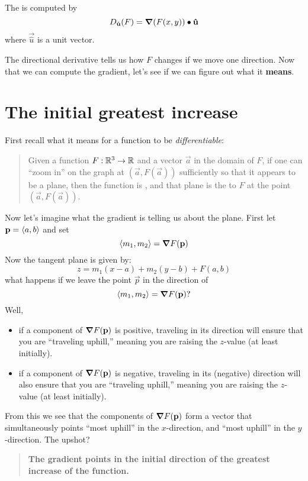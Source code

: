 \documentclass{ximera}
\begin{document}
\begin{definition}
  The  is computed by
  \[
  D_\mathbf{\hat{u}}(F) = \boldsymbol\nabla(F(x,y))\bullet \mathbf{\hat{u}}
  \]
  where $\vec{\hat{u}}$ is a unit vector.
\end{definition}

The directional derivative tells us how $F$ changes if we move one
direction.  Now that we can compute the gradient, let's see if we can
figure out what it \textbf{means}.

\section{The initial greatest increase}

First recall what it means for a function to be \textit{differentiable}:
\begin{quote}%
  Given a function $F:\mathbb R^3\to\mathbb R$ and a vector $\vec{a}$ in the domain
  of $F$, if one can ``zoom in'' on the graph at $(\vec{a}, F(\vec{a}))$
  sufficiently so that it appears to be a plane, then the
  function is , and that plane is the 
  to $F$ at the point $(\vec{a},F(\vec{a}))$.
\end{quote}

Now let's imagine what the gradient is telling us about the
plane. First let $\mathbf{p}=\left\langle a,b\right\rangle$ and set
\[
\left\langle m_1,m_2\right\rangle = \boldsymbol\nabla F(\mathbf{p})
\]
Now the tangent plane is given by: 
\[
z = m_1 (x-a) + m_2 (y-b) + F(a,b)
\]
what happens if we leave the point $\vec{p}$ in the direction of
\[
\left\langle m_1,m_2\right\rangle = \boldsymbol\nabla F(\mathbf{p})?
\]
Well,
\begin{itemize}
  \item if a component of $\boldsymbol\nabla F(\mathbf{p})$ is positive, traveling in
    its direction will ensure that you are ``traveling uphill,''
    meaning you are raising the $z$-value (at least initially).
\item if a component of $\boldsymbol\nabla F(\mathbf{p})$ is negative, traveling in its
  (negative) direction will also ensure that you are ``traveling
  uphill,'' meaning you are raising the $z$-value (at least
  initially).
\end{itemize}
From this we see that the components of $\boldsymbol\nabla F(\mathbf{p})$ form a
vector that simultaneously points ``most uphill'' in the
$x$-direction, and ``most uphill'' in the $y$-direction. The upshot?
\begin{quote}
  \textbf{The gradient points in the initial direction of the greatest
    increase of the function.}
\end{quote}
\end{document}
